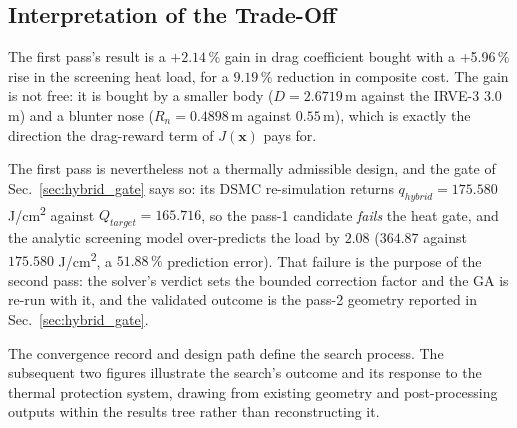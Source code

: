 \subsection{Interpretation of the Trade-Off}
The first pass's result is a $+2.14\,\%$ gain in drag coefficient bought with a +5.96\,\% rise in the screening heat load, for a $9.19\,\%$ reduction in composite cost. The gain is not free: it is bought by a smaller body ($D = 2.6719$\,m against the IRVE-3 $3.0$\,m) and a blunter nose ($R_n = 0.4898$\,m against $0.55$\,m), which is exactly the direction the drag-reward term of $J(\mathbf{x})$ pays for.

The first pass is nevertheless not a thermally admissible design, and the gate of Sec.~\ref{sec:hybrid_gate} says so: its DSMC re-simulation returns $q_{hybrid} = 175.580$ J/cm\textsuperscript{2} against $Q_{target} = 165.716$, so the pass-1 candidate \emph{fails} the heat gate, and the analytic screening model over-predicts the load by $2.08$ ($364.87$ against $175.580$ J/cm\textsuperscript{2}, a $51.88\,\%$ prediction error). That failure is the purpose of the second pass: the solver's verdict sets the bounded correction factor and the GA is re-run with it, and the validated outcome is the pass-2 geometry reported in Sec.~\ref{sec:hybrid_gate}.



The convergence record and design path define the search process. The subsequent two figures illustrate the search's outcome and its response to the thermal protection system, drawing from existing geometry and post-processing outputs within the results tree rather than reconstructing it.


